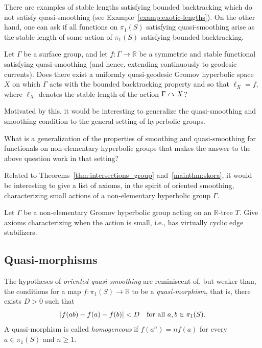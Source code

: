 There are examples of stable lengths satisfying bounded backtracking
which do not satisfy quasi-smoothing
(see Example~\ref{examp:exotic-lengths}). On the other hand, one
can ask if all functions on $\pi_1(S)$ satisfying quasi-smoothing
arise as the stable length of some action of $\pi_1(S)$ satisfying
bounded backtracking. 

\begin{question}
Let $\Gamma$ be a surface group, and let $f \colon \Gamma \to \mathbb{R}$ be a symmetric and stable functional satisfying quasi-smoothing (and hence, extending continuously to geodesic currents).
Does there exist a uniformly quasi-geodesic Gromov hyperbolic space $X$ on which $\Gamma$ acts with the bounded backtracking property and so that $\ell_X = f$, where $\ell_X$ denotes the stable length of the action $\Gamma \curvearrowright X$?
\end{question}

Motivated by this, it would be interesting to generalize the quasi-smoothing and smoothing condition to the general setting of hyperbolic groups.

\begin{question}
What is a generalization of the properties of smoothing and
quasi-smoothing for functionals on non-elementary hyperbolic groups
that makes the answer to the
above question work in that setting?
\end{question}

Related to Theorems~\ref{thm:intersections_group}
and~\ref{mainthm:skora}, it would be interesting to give a list of
axioms, in the spirit of oriented smoothing, characterizing
small actions of a non-elementary hyperbolic group $\Gamma$.

\begin{question}
\label{qu:generalize_intersections}
Let $\Gamma$ be a non-elementary Gromov hyperbolic group acting on an
$\mathbb{R}$-tree $T$. Give axioms  characterizing when the action is small, i.e., has
virtually cyclic edge stabilizers.
\end{question}

\subsection{Quasi-morphisms} 
\label{sub:quasimorphism} 

The hypotheses of \emph{oriented quasi-smoothing} are reminiscent of, but weaker than, the conditions for a map 
$f \colon \pi_1(S) \to \mathbb{R}$ to be a \emph{quasi-morphism}, that is, there exists $D > 0$ such that 
\[
\lvert f(ab) - f(a) - f(b)\rvert < D \quad \text{for all } a,b \in \pi_1(S).
\]
A quasi-morphism is called \emph{homogeneous} if $f(a^n) = n f(a)$ for every $a \in \pi_1(S)$ and $n \ge 1$.

